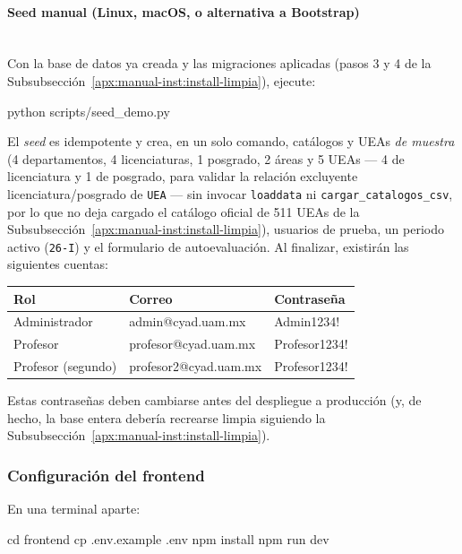 \paragraph{Seed manual (Linux, macOS, o alternativa a Bootstrap)}\mbox{}\\
Con la base de datos ya creada y las migraciones aplicadas (pasos 3 y 4 de la Subsubsección~\ref{apx:manual-inst:install-limpia}), ejecute:

\begin{Comandos}
python scripts/seed_demo.py
\end{Comandos}

El \emph{seed} es idempotente y crea, en un solo comando, catálogos y UEAs \emph{de muestra} (4 departamentos, 4 licenciaturas, 1 posgrado, 2 áreas y 5 UEAs — 4 de licenciatura y 1 de posgrado, para validar la relación excluyente licenciatura/posgrado de \texttt{UEA} — sin invocar \texttt{loaddata} ni \texttt{cargar\_catalogos\_csv}, por lo que no deja cargado el catálogo oficial de 511 UEAs de la Subsubsección~\ref{apx:manual-inst:install-limpia}), usuarios de prueba, un periodo activo (\texttt{26-I}) y el formulario de autoevaluación. Al finalizar, existirán las siguientes cuentas:

\begin{longtable}{p{} p{} p{}}
    \toprule
    \textbf{Rol} & \textbf{Correo} & \textbf{Contraseña} \\
    \midrule
    \endhead
    Administrador & admin@cyad.uam.mx & Admin1234! \\
    \midrule
    Profesor & profesor@cyad.uam.mx & Profesor1234! \\
    \midrule
    Profesor (segundo) & profesor2@cyad.uam.mx & Profesor1234! \\
    \bottomrule
\end{longtable}

Estas contraseñas deben cambiarse antes del despliegue a producción (y, de hecho, la base entera debería recrearse limpia siguiendo la Subsubsección~\ref{apx:manual-inst:install-limpia}).

\subsubsection{Configuración del frontend}
\label{apx:manual-inst:frontend}

En una terminal aparte:

\begin{Comandos}
cd frontend
cp .env.example .env
npm install
npm run dev
\end{Comandos}

